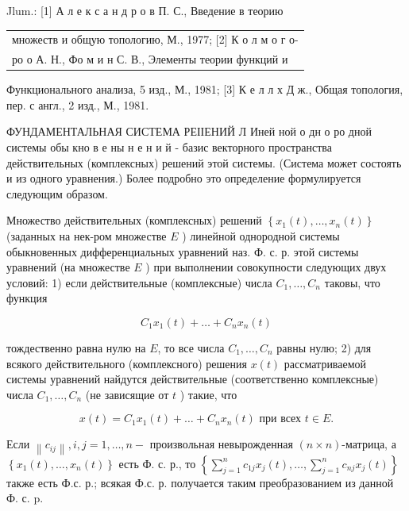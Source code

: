 \documentclass[10pt]{article}
\begin{document}
Jlum.: [1] А л е к с а н д р о в П. С., Введение в теорию \begin{tabular}{l}

множеств и общую топологию, М., 1977; [2] К о л м о г о- \\

ро о А. Н., Фо м и н С. В., Элементы теории функций и \\

\hline

\end{tabular} Функционального анализа, 5 изд., М., 1981; [3] К е л л х Д ж., Общая топология, пер. с англ., 2 изд., М., 1981.



ФУНДАМЕНТАЛЬНАЯ СИСТЕМА РЕІІЕНИЙ Л Иней ной о дн о ро дной системы обы кно в е ны н е н и й - базис векторного пространства действительных (комплексных) решений этой системы. (Система может состоять и из одного уравнения.) Более подробно это определение формулируется следующим образом.



Множество действительных (комплексных) решений $\left\{x_{1}(t), \ldots, x_{n}(t)\right\}$ (заданных на нек-ром множестве $E$ ) линейной однородной системы обыкновенных дифференциальных уравнений наз. Ф. с. р. этой системы уравнений (на множестве $E$ ) при выполнении совокупности следующих двух условий: 1) если действительные (комплексные) числа $C_{1}, \ldots, C_{n}$ таковы, что функция



\[

C_{1} x_{1}(t)+\ldots+C_{n} x_{n}(t)

\]



тождественно равна нулю на $E$, то все числа $C_{1}, \ldots, C_{n}$ равны нулю; 2) для всякого действительного (комплексного) решения $x(t)$ рассматриваемой системы уравнений найдутся действительные (соответственно комплексные) числа $C_{1}, \ldots, C_{n}$ (не зависящие от $t$ ) такие, что



\[

x(t)=C_{1} x_{1}(t)+\ldots+C_{n} x_{n}(t) \text { при всех } t \in E .

\]



Если $\left\|c_{i j}\right\|, i, j=1, \ldots, n-$ произвольная невырожденная $(n \times n)$-матрица, а $\left\{x_{1}(t), \ldots, x_{n}(t)\right\}$ есть Ф. с. р., то $\left\{\sum_{j=1}^{n} c_{1 j} x_{j}(t), \ldots, \sum_{j=1}^{n} c_{n j} x_{j}(t)\right\}$ также есть Ф.с. р.; всякая Ф.с. р. получается таким преобразованием из данной Ф. с. p.
\end{document}
